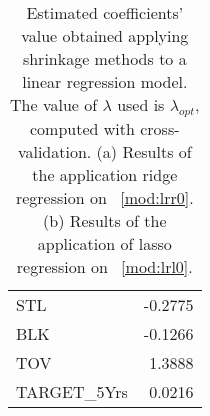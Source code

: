 \begin{table}[h]
\begin{subtable}{0.4\textwidth}
{\begin{tabular}{|| l | r ||}
			STL & -0.2775 \\
			BLK & -0.1266 \\
			TOV & 1.3888 \\ 
			TARGET\_5Yrs & 0.0216 \\				
			\hline
		\end{tabular}%
		}	
		\caption{}
		\label{table:FinalLassoCoef}
	\end{subtable}
	\caption{Estimated coefficients' value obtained applying shrinkage methods to a linear regression model. The value of $\lambda$ used is $\lambda_{opt}$, computed with cross-validation. (a) Results of the application ridge regression on \Mod~\ref{mod:lrr0}. (b) Results of the application of lasso regression on \Mod~\ref{mod:lrl0}.}
	\label{table:RegModSum}
\end{table}
